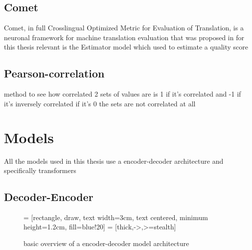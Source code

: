 \subsection{Comet}
Comet, in full Crosslingual Optimized Metric for Evaluation of Translation, is a neuronal framework for machine translation evaluation that was proposed in \cite{rei-etal-2020-comet} 
for this thesis relevant is the Estimator model which used to estimate a quality score 

\subsection{Pearson-correlation}
method to see how correlated 2 sets of values are
is 1 if it's correlated and -1 if it's inversely correlated 
if it's 0 the sets are not correlated at all

\section{Models}
\label{ch:models}
All the models used in this thesis use a encoder-decoder architecture and specifically transformers
\subsection{Decoder-Encoder}

\begin{figure}
    \centering
     = [rectangle, draw, text width=3cm, text centered, minimum height=1.2cm, fill=blue!20]
 = [thick,->,>=stealth]

\caption{basic overview of a encoder-decoder model architecture}
\label{fig:encoderdecodermodel}
\end{figure}

